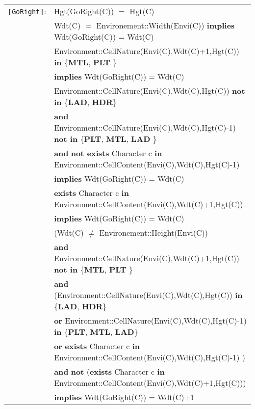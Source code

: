 \documentclass{article}
\begin{document}
\begin{tabular}{rl}
\texttt{[GoRight]}: & \textrm{Hgt(GoRight(C))} $=$ \textrm{Hgt(C)} \\
& \textrm{Wdt(C)} $=$ \textrm{Environement::Width(Envi(C))} \textbf{implies} \textrm{Wdt(GoRight(C))} = \textrm{Wdt(C)} \\
& \textrm{Environment::CellNature(Envi(C),Wdt(C)+1,Hgt(C))} \textbf{in} \{\textbf{MTL}, \textbf{PLT} \}\\
& \quad \textbf{implies} \textrm{Wdt(GoRight(C))} = \textrm{Wdt(C)} \\
& \textrm{Environment::CellNature(Envi(C),Wdt(C),Hgt(C))} \textbf{not in} \{\textbf{LAD}, \textbf{HDR}\}
\\ & \quad\quad \textbf{and} \textrm{Environment::CellNature(Envi(C),Wdt(C),Hgt(C)-1)} \textbf{not in} \{\textbf{PLT}, \textbf{MTL}, \textbf{LAD} \} \\
& \quad\quad \textbf{and} \textbf{not exists} \textrm{Character} c \textbf{in} \textrm{Environment::CellContent(Envi(C),Wdt(C),Hgt(C)-1)} \\
& \quad\quad \textbf{implies} \textrm{Wdt(GoRight(C))} = \textrm{Wdt(C)} \\
& \textbf{exists} \textrm{Character} c \textbf{in} \textrm{Environment::CellContent(Envi(C),Wdt(C)+1,Hgt(C))} \\ & \quad\quad \textbf{implies} \textrm{Wdt(GoRight(C))} = \textrm{Wdt(C)} \\
& (\textrm{Wdt(C)} $\neq$ \textrm{Environement::Height(Envi(C))} \\
& \quad \textbf{and} \textrm{Environment::CellNature(Envi(C),Wdt(C)+1,Hgt(C))} \textbf{not in} \{\textbf{MTL}, \textbf{PLT} \} \\
& \quad\quad \textbf{and} (\textrm{Environment::CellNature(Envi(C),Wdt(C),Hgt(C))} \textbf{in} \{\textbf{LAD}, \textbf{HDR}\} \\
& \quad\quad\quad\quad \textbf{or} \textrm{Environment::CellNature(Envi(C),Wdt(C),Hgt(C)-1)} \textbf{in} \{\textbf{PLT}, \textbf{MTL}, \textbf{LAD}\} \\
& \quad\quad\quad\quad \textbf{or} \textbf{exists} \textrm{Character} c \textbf{in} \textrm{Environment::CellContent(Envi(C),Wdt(C),Hgt(C)-1)} ) \\
& \quad\quad \textbf{and} \textbf{not} (\textbf{exists} \textrm{Character} c \textbf{in} \textrm{Environment::CellContent(Envi(C),Wdt(C)+1,Hgt(C))}) \\
& \quad\quad \textbf{implies} \textrm{Wdt(GoRight(C))} = \textrm{Wdt(C)}+1 \\
\end{tabular}
\end{document}
